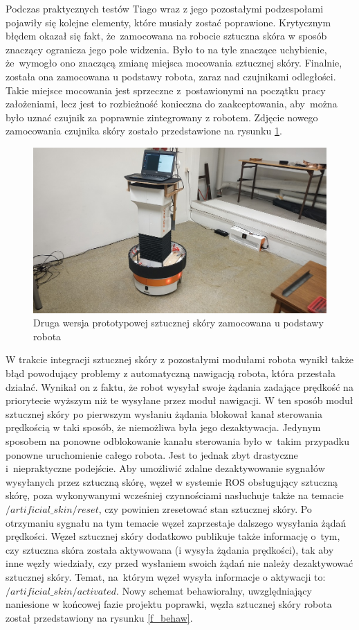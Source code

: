 Podczas praktycznych testów Tiago wraz z jego pozostałymi podzespołami pojawiły się kolejne elementy, które musiały zostać poprawione. Krytycznym błędem okazał się fakt, że~zamocowana na robocie sztuczna skóra w sposób znaczący ogranicza jego pole widzenia. Było to na tyle znaczące uchybienie, że~wymogło ono znaczącą zmianę miejsca mocowania sztucznej skóry. Finalnie, została ona zamocowana u podstawy robota, zaraz nad czujnikami odległości. Takie miejsce mocowania jest sprzeczne z~postawionymi na początku pracy założeniami, lecz jest to rozbieżność konieczna do zaakceptowania, aby~można było uznać czujnik za poprawnie zintegrowany z robotem. Zdjęcie nowego zamocowania czujnika skóry zostało przedstawione na rysunku \ref{f_test_test_2}.

\begin{figure}[!h]
    \centering 
    \includegraphics[width=0.95\linewidth]{img/test_okr_test_2.jpg}
    \caption{Druga wersja prototypowej sztucznej skóry zamocowana u podstawy robota}
    \label{f_test_test_2}
\end{figure}

W trakcie integracji sztucznej skóry z pozostałymi modułami robota wynikł także błąd powodujący problemy z automatyczną nawigacją robota, która przestała działać. Wynikał on z faktu, że robot wysyłał swoje żądania zadające prędkość na priorytecie wyższym niż te wysyłane przez moduł nawigacji. W ten sposób moduł sztucznej skóry po pierwszym wysłaniu żądania blokował kanał sterowania prędkością w taki sposób, że niemożliwa była jego dezaktywacja. Jedynym sposobem na ponowne odblokowanie kanału sterowania było w~takim przypadku ponowne uruchomienie całego robota. Jest to jednak zbyt drastyczne i~niepraktyczne podejście. Aby umożliwić zdalne dezaktywowanie sygnałów wysyłanych przez sztuczną skórę, węzeł w systemie ROS obsługujący sztuczną skórę, poza wykonywanymi wcześniej czynnościami nasłuchuje także na temacie $/artificial\_skin/reset$, czy powinien zresetować stan sztucznej skóry. Po otrzymaniu sygnału na tym temacie węzeł zaprzestaje dalszego wysyłania żądań prędkości. Węzeł sztucznej skóry dodatkowo publikuje także informację o~tym, czy sztuczna skóra została aktywowana (i wysyła żądania prędkości), tak aby inne węzły wiedziały, czy przed wysłaniem swoich żądań nie należy dezaktywować sztucznej skóry. Temat, na~którym węzeł wysyła informacje o aktywacji to:~$/artificial\_skin/activated$. Nowy schemat behawioralny, uwzględniający naniesione w końcowej fazie projektu poprawki, węzła sztucznej skóry robota został przedstawiony na rysunku \ref{f_behaw}.

